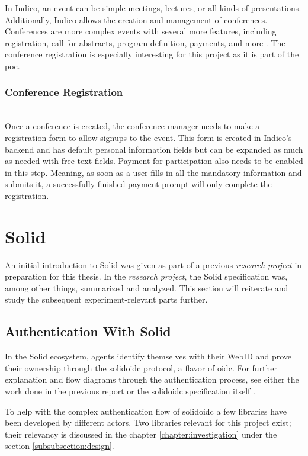 In Indico, an event can be simple meetings, lectures, or all kinds of presentations. Additionally, Indico allows the creation and management of conferences. Conferences are more complex events with several more features, including registration, call-for-abstracts, program definition, payments, and more \cite{cern-indico-docs}. The conference registration is especially interesting for this project as it is part of the \gls{poc}.

\subsubsection{Conference Registration}\mbox{}\\

Once a conference is created, the conference manager needs to make a registration form to allow signups to the event. This form is created in Indico's backend and has default personal information fields but can be expanded as much as needed with free text fields. Payment for participation also needs to be enabled in this step. Meaning, as soon as a user fills in all the mandatory information and submits it, a successfully finished payment prompt will only complete the registration.

\section{Solid}

An initial introduction to Solid was given as part of a previous \textit{research project} \cite{cern-solid-investigation-spec} in preparation for this thesis. In the \textit{research project}, the Solid specification was, among other things, summarized and analyzed. This section will reiterate and study the subsequent experiment-relevant parts further.

\subsection{Authentication With Solid}

In the Solid ecosystem, agents identify themselves with their WebID and prove their ownership through the \gls{solidoidc} protocol, a flavor of \gls{oidc}. For further explanation and flow diagrams through the authentication process, see either the work done in the previous report \cite{cern-solid-investigation-spec} or the \gls{solidoidc} specification itself \cite{solid-ecosystem-oidc}.

To help with the complex authentication flow of \gls{solidoidc} a few libraries have been developed by different actors. Two libraries relevant for this project exist; their relevancy is discussed in the chapter \ref{chapter:investigation} under the section \ref{subsubsection:design}.

